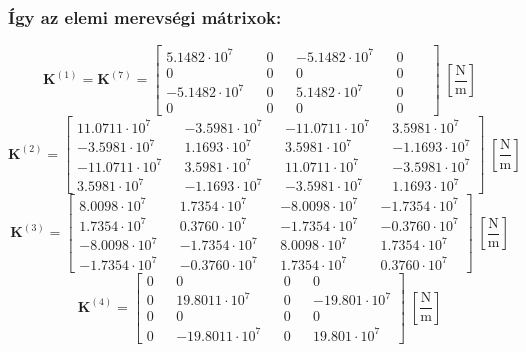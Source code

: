 \documentclass[12pt,a4paper]{article}
\def\mx#1{\mathbf{#1}}
\def\Nm{\; \left[\mathrm{\frac{N}{m}}\right]}
\def\futyi{\cdot 10^{7}}
\begin{document}
\subsubsection*{Így az elemi merevségi mátrixok:}
\begin{equation}
    \mx{K}^{\left(1\right)}=\mx{K}^{\left(7\right)}=
    \begin{bmatrix}
        5.1482 \futyi  &  & 0 &  & -5.1482 \futyi &  & 0      \\
        0              &  & 0 &  & 0              &  & 0 &  & \\
        -5.1482 \futyi &  & 0 &  & 5.1482 \futyi  &  & 0      \\
        0              &  & 0 &  & 0              &  & 0 &  &
    \end{bmatrix} \Nm
\end{equation}
\begin{equation}
    \mx{K}^{\left(2\right)}=
    \begin{bmatrix}
        11.0711 \futyi  &  & -3.5981 \futyi &  & -11.0711 \futyi &  & 3.5981 \futyi  \\
        -3.5981 \futyi  &  & 1.1693 \futyi  &  & 3.5981 \futyi   &  & -1.1693 \futyi \\
        -11.0711 \futyi &  & 3.5981 \futyi  &  & 11.0711 \futyi  &  & -3.5981 \futyi \\
        3.5981 \futyi   &  & -1.1693 \futyi &  & -3.5981 \futyi  &  & 1.1693 \futyi
    \end{bmatrix} \Nm
\end{equation}
\begin{equation}
    \mx{K}^{\left(3\right)}=
    \begin{bmatrix}
        8.0098 \futyi  &  & 1.7354 \futyi  &  & -8.0098 \futyi &  & -1.7354 \futyi \\
        1.7354 \futyi  &  & 0.3760 \futyi  &  & -1.7354 \futyi &  & -0.3760 \futyi \\
        -8.0098 \futyi &  & -1.7354 \futyi &  & 8.0098 \futyi  &  & 1.7354 \futyi  \\
        -1.7354 \futyi &  & -0.3760 \futyi &  & 1.7354 \futyi  &  & 0.3760 \futyi
    \end{bmatrix} \Nm
\end{equation}
\begin{equation}
    \mx{K}^{\left(4\right)}=
    \begin{bmatrix}
        0 &  & 0               &  & 0 &  & 0              \\
        0 &  & 19.8011 \futyi  &  & 0 &  & -19.801 \futyi \\
        0 &  & 0               &  & 0 &  & 0              \\
        0 &  & -19.8011 \futyi &  & 0 &  & 19.801 \futyi
    \end{bmatrix} \Nm
\end{equation}
\end{document}
